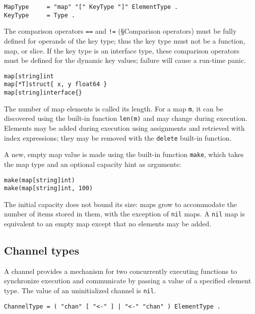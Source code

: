 \begin{Verbatim}[frame=single]
MapType     = "map" "[" KeyType "]" ElementType .
KeyType     = Type .
\end{Verbatim}

The comparison operators \texttt{==} and \texttt{!=}
(§Comparison operators) must be fully
defined for operands of the key type; thus the key type must not be a
function, map, or slice. If the key type is an interface type, these
comparison operators must be defined for the dynamic key values; failure
will cause a run-time panic.

\begin{Verbatim}[frame=single]
map[string]int
map[*T]struct{ x, y float64 }
map[string]interface{}
\end{Verbatim}

The number of map elements is called its length. For a map \texttt{m},
it can be discovered using the built-in function
\texttt{len(m)} and may change during
execution. Elements may be added during execution using
assignments and retrieved with
index expressions; they may be removed with the
\texttt{delete} built-in
function.

A new, empty map value is made using the built-in function
\texttt{make}, which
takes the map type and an optional capacity hint as arguments:

\begin{Verbatim}[frame=single]
make(map[string]int)
make(map[string]int, 100)
\end{Verbatim}

The initial capacity does not bound its size: maps grow to accommodate
the number of items stored in them, with the exception of \texttt{nil}
maps. A \texttt{nil} map is equivalent to an empty map except that no
elements may be added.

\subsection*{Channel types}

A channel provides a mechanism for two concurrently executing functions
to synchronize execution and communicate by passing a value of a
specified element type. The value of an uninitialized channel is
\texttt{nil}.

\begin{Verbatim}[frame=single]
ChannelType = ( "chan" [ "<-" ] | "<-" "chan" ) ElementType .
\end{Verbatim}

